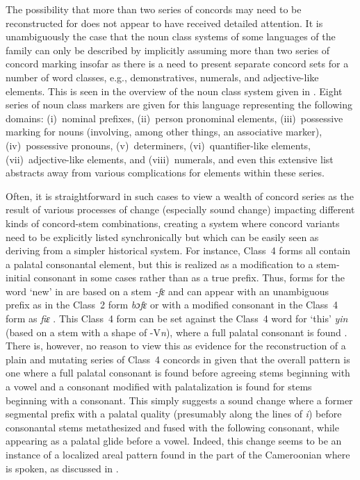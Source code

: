 \documentclass[output=paper ,collection	  ,collectionchapter ,biblatexbackend=biber   ]{langscibook}
\begin{document}
The possibility that more than two series of concords may need to be reconstructed for 
 does not appear to have received detailed attention. 
It is unambiguously the case that the noun class systems of
some languages of the family can only be described by implicitly assuming more
than two series of concord marking insofar as there is a need to present
separate concord sets for a number of word classes, e.g., demonstratives,
numerals, and adjective-like elements. This is seen in the overview
of the  noun class system given in . Eight series
of noun class markers are given for this language representing the following
domains: (i)~nominal prefixes, (ii)~person pronominal elements, (iii)~possessive
marking for nouns (involving, among other things, an associative marker),
(iv)~possessive pronouns, (v)~determiners, (vi)~quantifier-like elements,
(vii)~adjective-like elements, and (viii)~numerals, and even this extensive list
abstracts away from various complications for elements within these series.

Often, it is straightforward in such cases to view a wealth of concord series as
the result of various processes of change (especially sound change) impacting
different kinds of concord-stem combinations, creating a system where concord
variants need to be explicitly listed synchronically but which can be easily
seen as deriving from a simpler historical system. For instance,  Class~4
forms all contain a palatal consonantal element, but this is realized as a
modification to a stem-initial consonant in some cases rather than as a true
prefix. Thus, forms for the word `new' in  are based on a stem
\emph{-fε} and can appear with an unambiguous prefix as in the Class~2 form
\emph{bɔfε} or with a modified consonant in the Class~4 form as
\emph{fiε} \cite[26]{Hyman1981}. This Class~4 form can be set against the
Class~4 word for `this' \emph{yin} (based on a stem with a shape of -V\emph{n}),
where a full palatal consonant is found \cite[23]{Hyman1981}. There is,
however, no reason to view this as evidence for the reconstruction of a
plain  and mutating series of Class~4 concords in 
given that the overall pattern is one where a full palatal consonant is found
before agreeing stems beginning with a vowel and a consonant modified with
palatalization is found for stems beginning with a consonant. This simply
suggests a sound change where a former segmental prefix with a palatal quality
(presumably along the lines of \emph{i}) before consonantal stems metathesized
and fused with the following consonant, while appearing as a palatal glide
before a vowel. Indeed, this change seems to be an instance of a localized areal
pattern found in the part of the Cameroonian  where  is spoken,
as discussed in .
\end{document}
